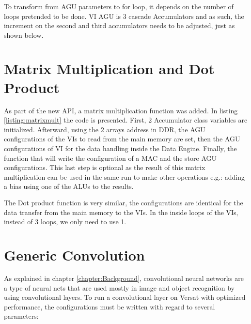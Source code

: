 

To transform from AGU parameters to for loop, it depends on the number of loops pretended to be done. VI AGU is 3 cascade Accumulators
and as such, the increment on the second and third accumulators needs to be adjusted, just as shown below.



\section{Matrix Multiplication and Dot Product}

As part of the new API, a matrix multiplication function was added. In listing \ref{listing:matrixmult} the code is presented. First, 2 Accumulator class variables are initialized.
Afterward, using the 2 arrays address in DDR, the AGU configurations of the VIs to read from the main memory are set, then the AGU configurations of VI for the data handling inside the Data Engine.
Finally, the function that will write the configuration of a MAC and the store AGU configurations. This last step is optional as the result of this matrix multiplication can be used in the same run
to make other operations e.g.: adding a bias using one of the ALUs to the results.



The Dot product function is very similar, the configurations are identical for the data transfer from the main memory to the VIs. In the inside loops of the VIs, instead of 3 loops, we only need to use 
1.

\section{Generic Convolution}

As explained in chapter \ref*{chapter:Background}, convolutional neural networks are a type of neural nets that are 
used mostly in image and object recognition by using convolutional layers. To run a convolutional layer on Versat with
optimized performance, the configurations must be written with regard to several parameters:

